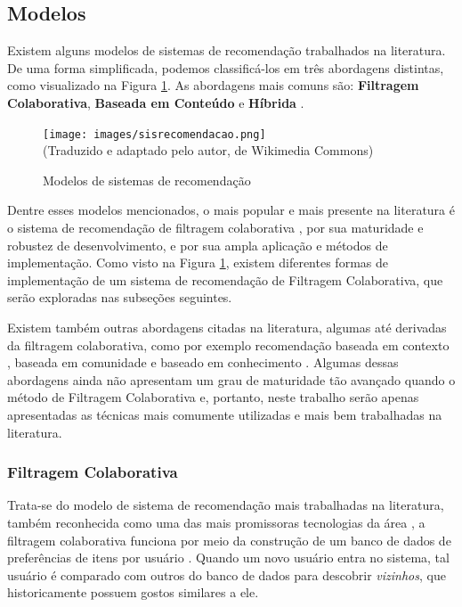 \documentclass[
	12pt,				%
	a4paper,			%
	english,			%
	french,				%
	spanish,			%
	brazil				%
	]{abntex2}
\begin{document}
\subsection{Modelos}

Existem alguns modelos de sistemas de recomendação trabalhados na literatura. De uma forma simplificada, podemos classificá-los em três abordagens distintas, como visualizado na Figura \ref{fig:sisrec}. As abordagens mais comuns são: \textbf{Filtragem Colaborativa}, \textbf{Baseada em Conteúdo} e \textbf{Híbrida} \cite{ricci2011introduction}.

\begin{figure}[H]
    \centering
    \caption{Modelos de sistemas de recomendação}
    \texttt{[image: images/sisrecomendacao.png]}
    \label{fig:sisrec}
    \\
    \textual (Traduzido e adaptado pelo autor, de Wikimedia Commons)
\end{figure}

Dentre esses modelos mencionados, o mais popular e mais presente na literatura é o sistema de recomendação de filtragem colaborativa \cite{ricci2011introduction, isinkaye2015recommendation, good1999combining}, por sua maturidade e robustez de desenvolvimento, e por sua ampla aplicação e métodos de implementação. Como visto na Figura \ref{fig:sisrec}, existem diferentes formas de implementação de um sistema de recomendação de Filtragem Colaborativa, que serão exploradas nas subseções seguintes.  

Existem também outras abordagens citadas na literatura, algumas até derivadas da filtragem colaborativa, como por exemplo recomendação baseada em contexto \cite{adomavicius2011context}, baseada em comunidade e baseado em conhecimento \cite[p. 13]{ricci2011introduction}. Algumas dessas abordagens ainda não apresentam um grau de maturidade tão avançado quando o método de Filtragem Colaborativa e, portanto, neste trabalho serão apenas apresentadas as técnicas mais comumente utilizadas e mais bem trabalhadas na literatura.

\subsubsection{Filtragem Colaborativa}

Trata-se do modelo de sistema de recomendação mais trabalhadas na literatura, também reconhecida como uma das mais promissoras tecnologias da área \cite{isinkaye2015recommendation, resnick1997recommender, schafer1999recommender}, a filtragem colaborativa funciona por meio da construção de um banco de dados de preferências de itens por usuário \cite{sarwar2002recommender}. Quando um novo usuário entra no sistema, tal usuário é comparado com outros do banco de dados para descobrir \emph{vizinhos}, que historicamente possuem gostos similares a ele.
\end{document}
